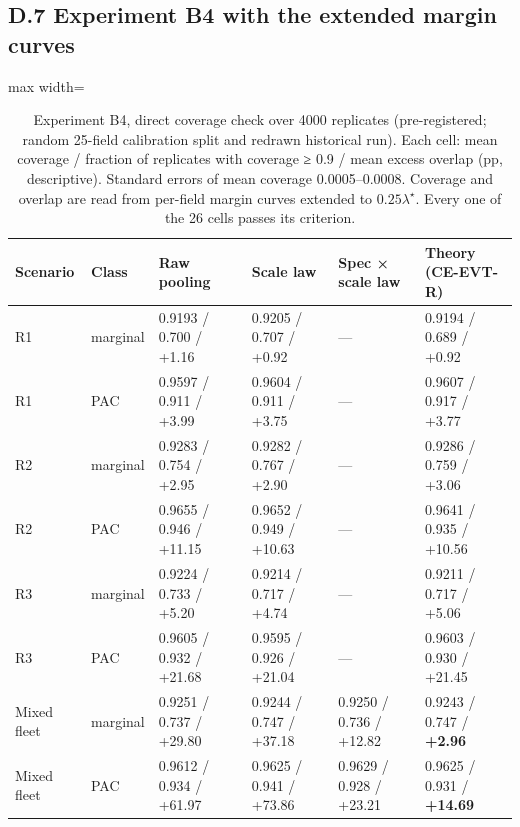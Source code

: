 \documentclass[preprint,12pt,authoryear]{elsarticle}
\begin{document}
\subsection*{D.7 Experiment B4 with the extended margin curves}

\begin{table}[!htbp]
\centering
\footnotesize
\renewcommand{\thetable}{S19a}\caption{Experiment B4, direct coverage check over 4000 replicates (pre-registered; random 25-field calibration split and redrawn historical run). Each cell: mean coverage / fraction of replicates with coverage ≥ 0.9 / mean excess overlap (pp, descriptive). Standard errors of mean coverage 0.0005--0.0008. Coverage and overlap are read from per-field margin curves extended to \(0.25\lambda^\star\). Every one of the 26 cells passes its criterion.}
\begin{adjustbox}{max width=\textwidth}
\begin{tabular}{@{}llllll@{}}
\toprule
\textbf{Scenario} & \textbf{Class} & \textbf{Raw pooling} & \textbf{Scale law} & \textbf{Spec × scale law} & \textbf{Theory (CE-EVT-R)} \\
\midrule
R1 & marginal & 0.9193 / 0.700 / +1.16 & 0.9205 / 0.707 / +0.92 & --- & 0.9194 / 0.689 / +0.92 \\
R1 & PAC & 0.9597 / 0.911 / +3.99 & 0.9604 / 0.911 / +3.75 & --- & 0.9607 / 0.917 / +3.77 \\
R2 & marginal & 0.9283 / 0.754 / +2.95 & 0.9282 / 0.767 / +2.90 & --- & 0.9286 / 0.759 / +3.06 \\
R2 & PAC & 0.9655 / 0.946 / +11.15 & 0.9652 / 0.949 / +10.63 & --- & 0.9641 / 0.935 / +10.56 \\
R3 & marginal & 0.9224 / 0.733 / +5.20 & 0.9214 / 0.717 / +4.74 & --- & 0.9211 / 0.717 / +5.06 \\
R3 & PAC & 0.9605 / 0.932 / +21.68 & 0.9595 / 0.926 / +21.04 & --- & 0.9603 / 0.930 / +21.45 \\
Mixed fleet & marginal & 0.9251 / 0.737 / +29.80 & 0.9244 / 0.747 / +37.18 & 0.9250 / 0.736 / +12.82 & 0.9243 / 0.747 / \textbf{+2.96} \\
Mixed fleet & PAC & 0.9612 / 0.934 / +61.97 & 0.9625 / 0.941 / +73.86 & 0.9629 / 0.928 / +23.21 & 0.9625 / 0.931 / \textbf{+14.69} \\
\bottomrule
\end{tabular}
\end{adjustbox}
\end{table}
\end{document}
